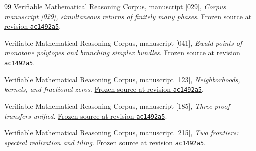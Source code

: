 \documentclass[11pt,a4paper]{article}
\theoremstyle{remark}\newtheorem{remark}[theorem]{Remark}
\begin{document}
\begin{thebibliography}{99}
Verifiable Mathematical Reasoning Corpus, manuscript [029], \emph{Corpus manuscript [029], simultaneous returns of finitely many phases}. 
\href{https://github.com/QEEDDD/Verifiable-Mathematical-Reasoning-Corpus/blob/ac1492a50784be919fe0b5e8f19f96f8d221a22e/\%5B029\%5D\%20Observation\%20and\%20Recovery\%20\%28Geometry\%2C\%20Mixtures\%2C\%20and\%20Spectral\%20Inversion\%29.tex}{Frozen source at revision \texttt{ac1492a5}}.

Verifiable Mathematical Reasoning Corpus, manuscript [041], \emph{Ewald points of monotone polytopes and branching simplex bundles}. 
\href{https://github.com/QEEDDD/Verifiable-Mathematical-Reasoning-Corpus/blob/ac1492a50784be919fe0b5e8f19f96f8d221a22e/\%5B041\%5D\%20Ewald\%20points\%20of\%20monotone\%20polytopes\%20the\%20minimum\%20in\%20dimension\%20eight\%20and\%20branching\%20simplex\%20bundles.tex}{Frozen source at revision \texttt{ac1492a5}}.

Verifiable Mathematical Reasoning Corpus, manuscript [123], \emph{Neighborhoods, kernels, and fractional zeros}. 
\href{https://github.com/QEEDDD/Verifiable-Mathematical-Reasoning-Corpus/blob/ac1492a50784be919fe0b5e8f19f96f8d221a22e/\%5B123\%5D\%20Neighborhoods_Kernels_and_Fractional_Zeros.tex}{Frozen source at revision \texttt{ac1492a5}}.

Verifiable Mathematical Reasoning Corpus, manuscript [185], \emph{Three proof transfers unified}. 
\href{https://github.com/QEEDDD/Verifiable-Mathematical-Reasoning-Corpus/blob/ac1492a50784be919fe0b5e8f19f96f8d221a22e/\%5B185\%5D\%20three_proof_transfers_unified.tex}{Frozen source at revision \texttt{ac1492a5}}.

Verifiable Mathematical Reasoning Corpus, manuscript [215], \emph{Two frontiers: spectral realization and tiling}. 
\href{https://github.com/QEEDDD/Verifiable-Mathematical-Reasoning-Corpus/blob/ac1492a50784be919fe0b5e8f19f96f8d221a22e/\%5B215\%5D\%20two_frontiers.tex}{Frozen source at revision \texttt{ac1492a5}}.

\end{thebibliography}
\end{document}

